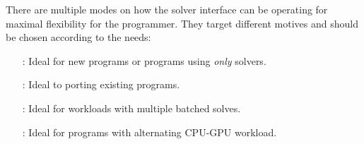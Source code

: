 

There are multiple modes on how the solver interface can be operating for maximal flexibility for the programmer.
They target different motives and should be chosen according to the needs:
\begin{itemize}[leftmargin=77pt]
  \item[\Cref{sec:develop:sync:way}:]    Ideal for new programs or programs using \emph{only} \quda solvers.
  \item[\Cref{sec:develop:openqcd:way}:] Ideal to porting existing programs.
  \item[\Cref{sec:develop:mrhs:way}:]    Ideal for workloads with multiple batched solves.
  \item[\Cref{sec:develop:async:way}:]   Ideal for programs with alternating CPU-GPU workload.
\end{itemize}

